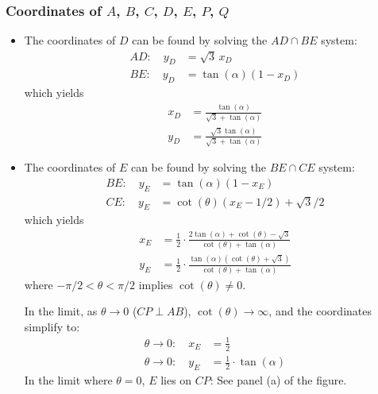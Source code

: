 \subsubsection*{Coordinates of $A$, $B$, $C$, $D$, $E$, $P$, $Q$}
\begin{itemize}
\item The coordinates of $D$ can be found by solving the $AD \cap BE$ system:
\begin{align*}
AD:\quad 
y_{D} & = \sqrt{3}\,x_{D}
\\
BE:\quad 
y_{D} & = \tan(\alpha) (1-x_{D})
\end{align*}
which yields
\begin{align*}
x_{D} & = \frac{\tan(\alpha)}{\sqrt{3}+\tan(\alpha)}
\\
y_{D} & = \frac{\sqrt{3}\tan(\alpha)}{\sqrt{3}+\tan(\alpha)}
\end{align*}

\item The coordinates of $E$ can be found by solving the $BE \cap CE$ system:
\begin{align*}
BE:\quad
y_{E} & = \tan(\alpha) (1-x_{E})
\\
CE:\quad
y_{E} & = \cot(\theta) (x_{E}-1/2) + \sqrt{3}/2
\end{align*}
which yields
\begin{align*}
x_{E} & = \frac{1}{2} \cdot \frac{2\tan(\alpha)+\cot(\theta)-\sqrt{3}}{\cot(\theta)+\tan(\alpha)}
\\
y_{E} & = \frac{1}{2} \cdot \frac{\tan(\alpha)(\cot(\theta)+\sqrt{3})}{\cot(\theta)+\tan(\alpha)}
\end{align*}
where $-\pi/2<\theta<\pi/2$ implies $\cot(\theta)\ne0$.

In the limit, as $\theta\to0$ ($CP \perp AB$), $\cot(\theta)\to\infty$, and the coordinates simplify to:
\begin{align*}
\theta \to 0: \quad
x_{E} & = \frac{1}{2}
\\
\theta \to 0: \quad
y_{E} & = \frac{1}{2} \cdot \tan(\alpha)
\end{align*}
In the limit where $\theta=0$, $E$ lies on $CP$: See panel (a) of the figure.


\end{itemize}
